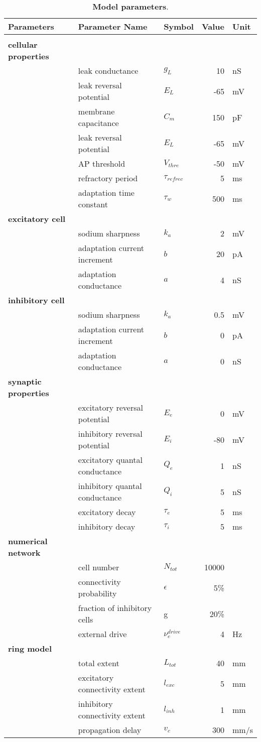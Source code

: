 \documentclass[8pt, colorlinks, a4paper]{article}
\begin{document}
\begin{table*}[tb!]
\caption{\label{table:params}\textbf{Model parameters}.}
\centering
\begin{tabular}{l|l|l|r|l}
\textbf{Parameters} & Parameter Name & Symbol & Value & Unit\\
\hline
 &  &  &  & \\
\textbf{cellular properties} &  &  &  & \\
 & leak conductance & \(g_L\) & 10 & nS\\
 & leak reversal potential & \(E_L\) & -65 & mV\\
 & membrane capacitance & \(C_m\) & 150 & pF\\
 & leak reversal potential & \(E_L\) & -65 & mV\\
 & AP threshold & \(V_{thre}\) & -50 & mV\\
 & refractory period & \(\tau_{refrec}\) & 5 & ms\\
 & adaptation time constant & \(\tau_w\) & 500 & ms\\
\textbf{excitatory cell} &  &  &  & \\
 & sodium sharpness & \(k_a\) & 2 & mV\\
 & adaptation current increment & \(b\) & 20 & pA\\
 & adaptation conductance & \(a\) & 4 & nS\\
\textbf{inhibitory cell} &  &  &  & \\
 & sodium sharpness & \(k_a\) & 0.5 & mV\\
 & adaptation current increment & \(b\) & 0 & pA\\
 & adaptation conductance & \(a\) & 0 & nS\\
\textbf{synaptic properties} &  &  &  & \\
 & excitatory reversal potential & \(E_e\) & 0 & mV\\
 & inhibitory reversal potential & \(E_i\) & -80 & mV\\
 & excitatory quantal conductance & \(Q_e\) & 1 & nS\\
 & inhibitory quantal conductance & \(Q_i\) & 5 & nS\\
 & excitatory decay & \(\tau_e\) & 5 & ms\\
 & inhibitory  decay & \(\tau_i\) & 5 & ms\\
\textbf{numerical network} &  &  &  & \\
 & cell number & \(N_{tot}\) & 10000 & \\
 & connectivity probability & \(\epsilon\) & 5\% & \\
 & fraction of inhibitory cells & g & 20\% & \\
 & external drive & \(\nu_e^{drive}\) & 4 & Hz\\
\textbf{ring model} &  &  &  & \\
 & total extent & \(L_{tot}\) & 40 & mm\\
 & excitatory connectivity extent & \(l_{exc}\) & 5 & mm\\
 & inhibitory connectivity extent & \(l_{inh}\) & 1 & mm\\
 & propagation delay & \(v_c\) & 300 & mm/s\\
\end{tabular}
\end{table*}
\end{document}
